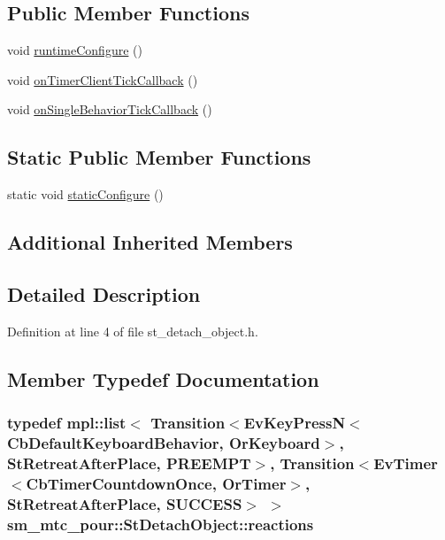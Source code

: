 \subsection*{Public Member Functions}
\begin{DoxyCompactItemize}
\item 
void \hyperlink{structsm__mtc__pour_1_1StDetachObject_a094b0fd1e095d06ad4c08e843689a2e2}{runtime\+Configure} ()
\item 
void \hyperlink{structsm__mtc__pour_1_1StDetachObject_a0bc7c49f65f1e5a90e74f60f37dc853c}{on\+Timer\+Client\+Tick\+Callback} ()
\item 
void \hyperlink{structsm__mtc__pour_1_1StDetachObject_afec421200739d7f7e20ce718d518fd68}{on\+Single\+Behavior\+Tick\+Callback} ()
\end{DoxyCompactItemize}
\subsection*{Static Public Member Functions}
\begin{DoxyCompactItemize}
\item 
static void \hyperlink{structsm__mtc__pour_1_1StDetachObject_a96e50eb03eb79b98fc60d5a42e51bc5b}{static\+Configure} ()
\end{DoxyCompactItemize}
\subsection*{Additional Inherited Members}


\subsection{Detailed Description}


Definition at line 4 of file st\+\_\+detach\+\_\+object.\+h.



\subsection{Member Typedef Documentation}
\subsubsection[{\texorpdfstring{reactions}{reactions}}]{\setlength{\rightskip}{0pt plus 5cm}typedef mpl\+::list$<$ Transition$<$Ev\+Key\+PressN$<$Cb\+Default\+Keyboard\+Behavior, {\bf Or\+Keyboard}$>$, {\bf St\+Retreat\+After\+Place}, {\bf P\+R\+E\+E\+M\+PT}$>$, Transition$<$Ev\+Timer$<$Cb\+Timer\+Countdown\+Once, {\bf Or\+Timer}$>$, {\bf St\+Retreat\+After\+Place}, {\bf S\+U\+C\+C\+E\+SS}$>$ $>$ {\bf sm\+\_\+mtc\+\_\+pour\+::\+St\+Detach\+Object\+::reactions}}\hypertarget{structsm__mtc__pour_1_1StDetachObject_ac2e4ab4d0a017971999d2a852f53a2b1}{}\label{structsm__mtc__pour_1_1StDetachObject_ac2e4ab4d0a017971999d2a852f53a2b1}


